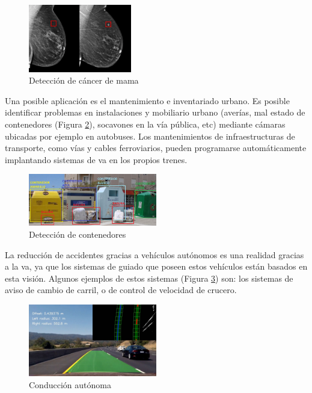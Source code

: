 \begin{figure}[H]
  \begin{center}
    \includegraphics[width=0.4\textwidth]{figures/Introduccion/cancer.png}
		\caption{Detección de cáncer de mama}
		\label{fig.cancer}
		\end{center}
\end{figure}


Una posible aplicación es el mantenimiento e inventariado urbano. Es posible identificar problemas en instalaciones y mobiliario urbano (averías, mal estado de contenedores (Figura \ref{fig.contenedor}), socavones en la vía pública, etc) mediante cámaras ubicadas por ejemplo en autobuses. Los mantenimientos de infraestructuras de transporte, como vías y cables ferroviarios, pueden programarse automáticamente implantando sistemas de \acrshort{va} en los propios trenes. 


\begin{figure}[H]
  \begin{center}
    \includegraphics[width=0.5\textwidth]{figures/Introduccion/contenedor.png}
		\caption{Detección de contenedores}
		\label{fig.contenedor}
		\end{center}
\end{figure}

La reducción de accidentes gracias a vehículos autónomos es una realidad gracias a la \acrshort{va}, ya que los sistemas de guiado que poseen estos vehículos están basados en esta visión. Algunos ejemplos de estos sistemas (Figura \ref{fig.car}) son: los sistemas de aviso de cambio de carril, o de control de velocidad de crucero. 

\begin{figure}[H]
  \begin{center}
    \includegraphics[width=0.5\textwidth]{figures/Introduccion/car.jpg}
		\caption{Conducción autónoma}
		\label{fig.car}
		\end{center}
\end{figure}


